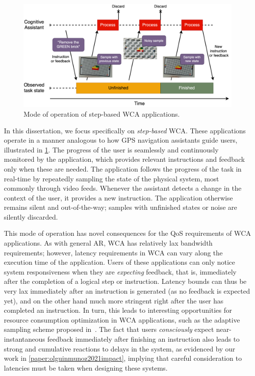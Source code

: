 \medskip

\begin{figure}
    \centering
    \includegraphics[width=.9\textwidth]{figures/wca_state}
    \caption{Mode of operation of step-based \acs{WCA} applications.}\label{fig:wca:operation}
\end{figure}

In this dissertation, we focus specifically on \emph{step-based} \gls{WCA}.
These applications operate in a manner analogous to how \gls{GPS} navigation assistants guide users, illustrated in \cref{fig:wca:operation}.
The progress of the user is seamlessly and continuously monitored by the application, which provides relevant instructions and feedback only when these are needed.
The application follows the progress of the task in real-time by repeatedly sampling the state of the physical system, most commonly through video feeds.
Whenever the assistant detects a change in the context of the user, it provides a new instruction.
The application otherwise remains silent and out-of-the-way; samples with unfinished states or noise are silently discarded.

This mode of operation has novel consequences for the \gls{QoS} requirements of \gls{WCA} applications.
As with general \gls{AR}, \gls{WCA} has relatively lax bandwidth requirements; however, latency requirements in \gls{WCA} can vary along the execution time of the application.
Users of these applications can only notice system responsiveness when they are \emph{expecting} feedback, that is, immediately after the completion of a logical step or instruction.
Latency bounds can thus be very lax immediately after an instruction is generated (as no feedback is expected yet), and on the other hand much more stringent right after the user has completed an instruction.
In turn, this leads to interesting opportunities for resource consumption optimization in \gls{WCA} applications, such as the adaptive sampling scheme proposed in~\cite{wang2019towards}.
The fact that users \emph{consciously} expect near-instantaneous feedback immediately after finishing an instruction also leads to strong and cumulative reactions to delays in the system, as evidenced by our work in \cref{paper:olguinmunoz2021impact}, implying that careful consideration to latencies must be taken when designing these systems.

